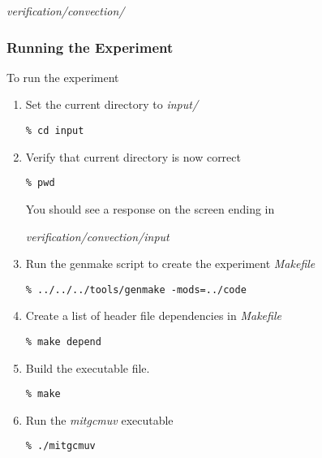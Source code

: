 \vspace{5mm}
{\it verification/convection/ }

\subsubsection{Running the Experiment}
\label{www:tutorials}

 To run the experiment

\begin{enumerate}
\item Set the current directory to {\it input/ }

\begin{verbatim}
% cd input
\end{verbatim}

\item Verify that current directory is now correct

\begin{verbatim}
% pwd
\end{verbatim}

 You should see a response on the screen ending in

{\it verification/convection/input }


\item Run the genmake script to create the experiment {\it Makefile}

\begin{verbatim}
% ../../../tools/genmake -mods=../code
\end{verbatim}

\item Create a list of header file dependencies in {\it Makefile}

\begin{verbatim}
% make depend
\end{verbatim}

\item Build the executable file.

\begin{verbatim}
% make
\end{verbatim}

\item Run the {\it mitgcmuv} executable

\begin{verbatim}
% ./mitgcmuv
\end{verbatim}

\end{enumerate}


